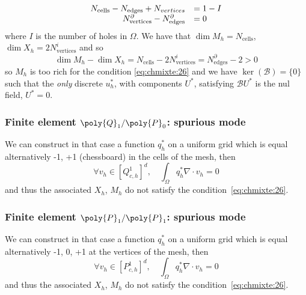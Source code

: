     \begin{equation}
      \label{eq:chmixte:28}
      \begin{array}[c]{rl}
        N_{\mathrm{cells}} - N_{\mathrm{edges}} + N_{vertices}  &= 1-I\\
      N^\partial_{\mathrm{vertices}} - N^\partial_{\mathrm{edges}} &= 0
      \end{array}
    \end{equation}
    where $I$ is the number of holes in $\Omega$.  We have that $\dim {M_h} =
    N_{\mathrm{cells}}$, $\dim {X_h} = 2 N^i_{\mathrm{vertices}}$ and so
    \begin{equation}
      \label{eq:chmixte:29}
      \dim {M_h} - \dim {X_h} = N_{\mathrm{cells}} - 2 N^i_{\mathrm{vertices}} =
      N^\partial_{\mathrm{edges}} - 2 > 0
    \end{equation}
    so $M_h$ is too rich for the condition \eqref{eq:chmixte:26} and we have
    $\ker(\mathcal{B}) = \{0\}$ such that the \emph{only} discrete $u_h^*$,
    with components $U^*$, satisfying $\mathcal{B} U^*$ is the nul field, $U^*=0$.


\subsubsection{Finite element $\poly{Q}_1/\poly{P}_0$: spurious mode}

    We can construct in that case a function $q_h^*$ on a uniform grid which is
    equal alternatively -1, +1 (chessboard) in the cells of  the mesh, then
    \begin{equation}
      \label{eq:chmixte:27}
      \forall v_h \in [Q^1_{c,h}]^d, \quad \int_\Omega q^*_h \nabla \cdot v_h = 0
    \end{equation}
    and thus the associated $X_h$, $M_h$ do not satisfy  the condition~\eqref{eq:chmixte:26}.

\subsubsection{Finite element $\poly{P}_1/\poly{P}_1$: spurious mode}
    We can construct in that case a function $q_h^*$ on a uniform grid which is
    equal alternatively -1, 0, +1 at the vertices of the mesh, then
    \begin{equation}
      \label{eq:chmixte:27}
      \forall v_h \in [P^1_{c,h}]^d, \quad \int_\Omega q^*_h \nabla \cdot v_h = 0
    \end{equation}
    and thus the associated $X_h$, $M_h$ do not satisfy  the condition~\eqref{eq:chmixte:26}.


